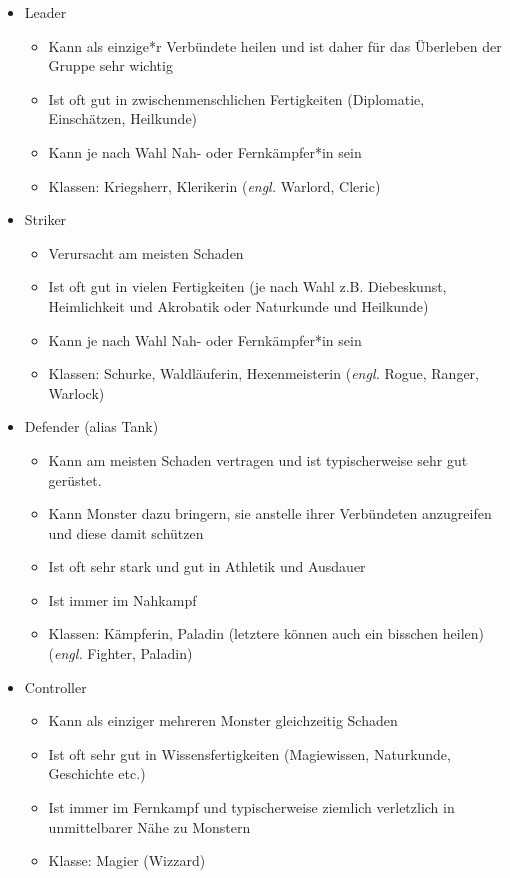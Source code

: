 \documentclass[a4paper]{article}
\begin{document}
\begin{itemize}
\item Leader
\begin{itemize}
\item Kann als einzige*r Verbündete heilen und ist daher für das Überleben der
Gruppe sehr wichtig
\item Ist oft gut in zwischenmenschlichen Fertigkeiten (Diplomatie,
Einschätzen, Heilkunde)
\item Kann je nach Wahl Nah- oder Fernkämpfer*in sein
\item Klassen: Kriegsherr, Klerikerin (\textsl{engl.} Warlord, Cleric)
\end{itemize}
\item Striker
\begin{itemize}
\item Verursacht am meisten Schaden
\item Ist oft gut in vielen Fertigkeiten (je nach Wahl z.B. Diebeskunst,
Heimlichkeit und Akrobatik oder Naturkunde und Heilkunde)
\item Kann je nach Wahl Nah- oder Fernkämpfer*in sein
\item Klassen: Schurke, Waldläuferin, Hexenmeisterin (\textsl{engl.} Rogue,
Ranger, Warlock)
\end{itemize}
\item Defender (alias Tank)
\begin{itemize}
\item Kann am meisten Schaden vertragen und ist typischerweise sehr gut
gerüstet.
\item Kann Monster dazu bringern, sie anstelle ihrer Verbündeten anzugreifen
und diese damit schützen
\item Ist oft sehr stark und gut in Athletik und Ausdauer
\item Ist immer im Nahkampf
\item Klassen: Kämpferin, Paladin (letztere können auch ein bisschen heilen)
(\textsl{engl.} Fighter, Paladin)
\end{itemize}
\item Controller
\begin{itemize}
\item Kann als einziger mehreren Monster gleichzeitig Schaden
\item Ist oft sehr gut in Wissensfertigkeiten (Magiewissen, Naturkunde,
Geschichte etc.)
\item Ist immer im Fernkampf und typischerweise ziemlich verletzlich in
unmittelbarer Nähe zu Monstern
\item Klasse: Magier (Wizzard)
\end{itemize}
\end{itemize}
\end{document}
